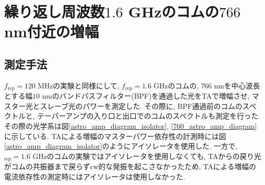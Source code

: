 \documentclass[uplatex, dvipdfmx, a4paper, report, papersize, 11pt]{jsbook}
\begin{document}
\section{繰り返し周波数$1.6$ GHzのコムの$766$ nm付近の増幅}
\subsection{測定手法}
$f_{\mathrm{rep}} = 120$ MHzの実験と同様にして, $f_{\mathrm{rep}} = 1.6$ GHzのコムの, $766$ nmを中心波長とする幅$10$ nmのバンドパスフィルター(BPF)を通過した光をTAで増幅させ, マスター光とスレーブ光のパワーを測定した. その際に, BPF通過前のコムのスペクトルと, テーパーアンプの入り口と出口でのコムのスペクトルも測定を行った. その際の光学系は図\ref{astro_amp_diagram_isolator}, \ref{760_astro_amp_diagram}に示している. TAによる増幅のマスターパワー依存性の計測時には図\ref{astro_amp_diagram_isolator}のようにアイソレータを使用した. 一方で, $_{\mathrm{rep}} = 1.6$
 GHzのコムの実験ではアイソレータを使用しなくても, TAからの戻り光がコムの共振器まで戻らずcw的な発振を起こさなかったため, TAによる増幅の電流依存性の測定時にはアイソレータは使用しなかった. \\
\end{document}
